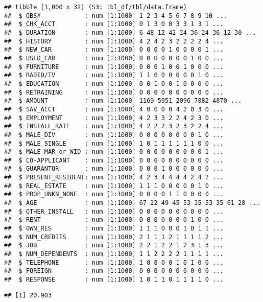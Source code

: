 \documentclass[
]{article}
\newenvironment{Shaded}{\begin{snugshade}}{\end{snugshade}}
\newcommand{\FunctionTok}[1]{\textcolor[rgb]{0.00,0.00,0.00}{#1}}
\newcommand{\NormalTok}[1]{#1}
\newcommand{\SpecialCharTok}[1]{\textcolor[rgb]{0.00,0.00,0.00}{#1}}
\begin{document}
\begin{verbatim}
## tibble [1,000 x 32] (S3: tbl_df/tbl/data.frame)
##  $ OBS#            : num [1:1000] 1 2 3 4 5 6 7 8 9 10 ...
##  $ CHK_ACCT        : num [1:1000] 0 1 3 0 0 3 3 1 3 1 ...
##  $ DURATION        : num [1:1000] 6 48 12 42 24 36 24 36 12 30 ...
##  $ HISTORY         : num [1:1000] 4 2 4 2 3 2 2 2 2 4 ...
##  $ NEW_CAR         : num [1:1000] 0 0 0 0 1 0 0 0 0 1 ...
##  $ USED_CAR        : num [1:1000] 0 0 0 0 0 0 0 1 0 0 ...
##  $ FURNITURE       : num [1:1000] 0 0 0 1 0 0 1 0 0 0 ...
##  $ RADIO/TV        : num [1:1000] 1 1 0 0 0 0 0 0 1 0 ...
##  $ EDUCATION       : num [1:1000] 0 0 1 0 0 1 0 0 0 0 ...
##  $ RETRAINING      : num [1:1000] 0 0 0 0 0 0 0 0 0 0 ...
##  $ AMOUNT          : num [1:1000] 1169 5951 2096 7882 4870 ...
##  $ SAV_ACCT        : num [1:1000] 4 0 0 0 0 4 2 0 3 0 ...
##  $ EMPLOYMENT      : num [1:1000] 4 2 3 3 2 2 4 2 3 0 ...
##  $ INSTALL_RATE    : num [1:1000] 4 2 2 2 3 2 3 2 2 4 ...
##  $ MALE_DIV        : num [1:1000] 0 0 0 0 0 0 0 0 1 0 ...
##  $ MALE_SINGLE     : num [1:1000] 1 0 1 1 1 1 1 1 0 0 ...
##  $ MALE_MAR_or_WID : num [1:1000] 0 0 0 0 0 0 0 0 0 1 ...
##  $ CO-APPLICANT    : num [1:1000] 0 0 0 0 0 0 0 0 0 0 ...
##  $ GUARANTOR       : num [1:1000] 0 0 0 1 0 0 0 0 0 0 ...
##  $ PRESENT_RESIDENT: num [1:1000] 4 2 3 4 4 4 4 2 4 2 ...
##  $ REAL_ESTATE     : num [1:1000] 1 1 1 0 0 0 0 0 1 0 ...
##  $ PROP_UNKN_NONE  : num [1:1000] 0 0 0 0 1 1 0 0 0 0 ...
##  $ AGE             : num [1:1000] 67 22 49 45 53 35 53 35 61 28 ...
##  $ OTHER_INSTALL   : num [1:1000] 0 0 0 0 0 0 0 0 0 0 ...
##  $ RENT            : num [1:1000] 0 0 0 0 0 0 0 1 0 0 ...
##  $ OWN_RES         : num [1:1000] 1 1 1 0 0 0 1 0 1 1 ...
##  $ NUM_CREDITS     : num [1:1000] 2 1 1 1 2 1 1 1 1 2 ...
##  $ JOB             : num [1:1000] 2 2 1 2 2 1 2 3 1 3 ...
##  $ NUM_DEPENDENTS  : num [1:1000] 1 1 2 2 2 2 1 1 1 1 ...
##  $ TELEPHONE       : num [1:1000] 1 0 0 0 0 1 0 1 0 0 ...
##  $ FOREIGN         : num [1:1000] 0 0 0 0 0 0 0 0 0 0 ...
##  $ RESPONSE        : num [1:1000] 1 0 1 1 0 1 1 1 1 0 ...
\end{verbatim}

\begin{Shaded}
\end{Shaded}

\begin{verbatim}
## [1] 20.903
\end{verbatim}
\end{document}
